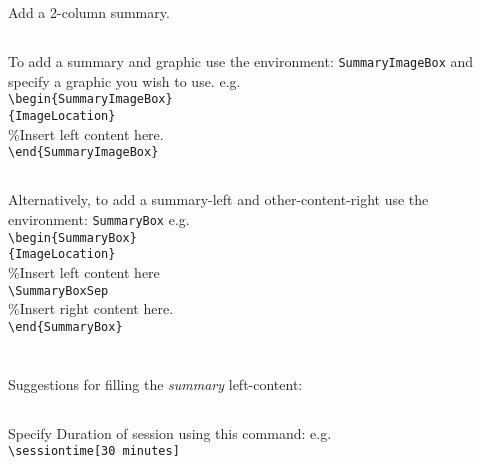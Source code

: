 \documentclass[a4paper]{GreyWolfsScoutActivityTemplate}
\begin{document}
\begin{ActivityProcedure}
\section{}
Add a 2-column summary.

\subsection{}
To add a summary and graphic use the environment: {\tt SummaryImageBox} and specify a graphic you wish to use. e.g.\\
{\tt \textbackslash{}begin\{SummaryImageBox\}\\\hspace*{5mm}\{ImageLocation\}}\\
\%Insert left content here.\\
{\tt \textbackslash{}end\{SummaryImageBox\}}

\subsection{}
Alternatively, to add a summary-left and other-content-right use the environment: {\tt SummaryBox} e.g.\\ 
{\tt \textbackslash{}begin\{SummaryBox\}\\\hspace*{5mm}\{ImageLocation\}}\\
\%Insert left content here\\
{\tt \textbackslash{}SummaryBoxSep}\\
\%Insert right content here.\\
{\tt \textbackslash{}end\{SummaryBox\}}

\section{}
Suggestions for filling the \textit{summary} left-content:

\subsection{}
Specify Duration of session using this command: e.g.\\
{\tt \textbackslash{}sessiontime[30~minutes]}


\end{ActivityProcedure}
\end{document}

